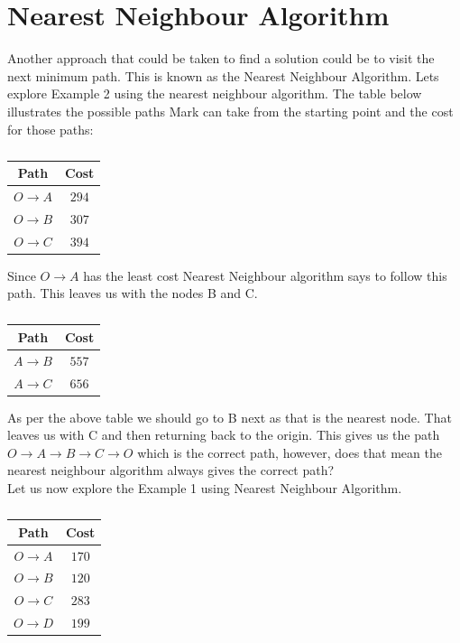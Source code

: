 \documentclass[a4paper]{article}
\begin{document}
\section*{Nearest Neighbour Algorithm}
Another approach that could be taken to find a solution could be to visit the next minimum path. This is known as the Nearest Neighbour Algorithm.
Lets explore Example 2 using the nearest neighbour algorithm. The table below illustrates the possible paths Mark can take from the starting point and the cost for those paths:
\begin{table}[H]
    \centering
    \begin{tabular}{|c|c|}
    \hline
    Path & Cost\\ 
    \hline
    $O\to A$ & $294$  \\
    $O\to B$ & $307$  \\
    $O\to C$ & $394$  \\
    \end{tabular}
    \caption{}
    \label{tab:path1Mark}
\end{table}
Since $O\to A$ has the least cost Nearest Neighbour algorithm says to follow this path. This leaves us with the nodes B and C.
\begin{table}[H]
    \centering
    \begin{tabular}{|c|c|}
    \hline
    Path & Cost\\ 
    \hline
    $A\to B$ & $557$  \\
    $A\to C$ & $656$  \\
    \end{tabular}
    \caption{}

    \label{tab:path2Mark}
\end{table}
As per the above table we should go to B next as that is the nearest node. That leaves us with C and then returning back to the origin. This gives us the path $O\to A \to B \to C \to O$ which is the correct path, however, does that mean the nearest neighbour algorithm always gives the correct path? \\
Let us now explore the Example 1 using Nearest Neighbour Algorithm.
\begin{table}[H]
    \centering
    \begin{tabular}{|c|c|}
    \hline
    Path & Cost\\ 
    \hline
    $O\to A$ & $170$  \\
    $O\to B$ & $120$  \\
    $O\to C$ & $283$  \\
    $O\to D$ & $199$  \\
    \end{tabular}
    \caption{}
    \label{tab:path1Suchir}
\end{table}
\end{document}
